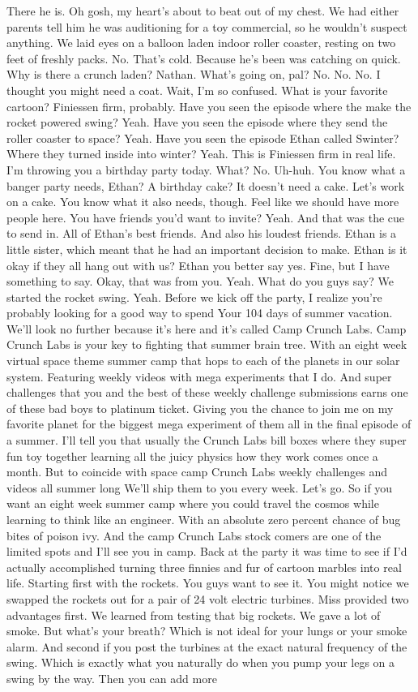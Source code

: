 \documentclass{article}
\begin{document}
There he is. Oh gosh, my heart's about to beat out of my chest. We had either parents tell him he was auditioning for a toy commercial, so he wouldn't suspect anything. We laid eyes on a balloon laden indoor roller coaster, resting on two feet of freshly packs. No. That's cold. Because he's been was catching on quick. Why is there a crunch laden? Nathan. What's going on, pal? No. No. No. I thought you might need a coat. Wait, I'm so confused. What is your favorite cartoon? Finiessen firm, probably. Have you seen the episode where the make the rocket powered swing? Yeah. Have you seen the episode where they send the roller coaster to space? Yeah. Have you seen the episode Ethan called Swinter? Where they turned inside into winter? Yeah. This is Finiessen firm in real life. I'm throwing you a birthday party today. What? No. Uh-huh. You know what a banger party needs, Ethan? A birthday cake? It doesn't need a cake. Let's work on a cake. You know what it also needs, though. Feel like we should have more people here. You have friends you'd want to invite? Yeah. And that was the cue to send in. All of Ethan's best friends. And also his loudest friends. Ethan is a little sister, which meant that he had an important decision to make. Ethan is it okay if they all hang out with us? Ethan you better say yes. Fine, but I have something to say. Okay, that was from you. Yeah. What do you guys say? We started the rocket swing. Yeah. Before we kick off the party, I realize you're probably looking for a good way to spend Your 104 days of summer vacation. We'll look no further because it's here and it's called Camp Crunch Labs. Camp Crunch Labs is your key to fighting that summer brain tree. With an eight week virtual space theme summer camp that hops to each of the planets in our solar system. Featuring weekly videos with mega experiments that I do. And super challenges that you and the best of these weekly challenge submissions earns one of these bad boys to platinum ticket. Giving you the chance to join me on my favorite planet for the biggest mega experiment of them all in the final episode of a summer. I'll tell you that usually the Crunch Labs bill boxes where they super fun toy together learning all the juicy physics how they work comes once a month. But to coincide with space camp Crunch Labs weekly challenges and videos all summer long We'll ship them to you every week. Let's go. So if you want an eight week summer camp where you could travel the cosmos while learning to think like an engineer. With an absolute zero percent chance of bug bites of poison ivy. And the camp Crunch Labs stock comers are one of the limited spots and I'll see you in camp. Back at the party it was time to see if I'd actually accomplished turning three finnies and fur of cartoon marbles into real life. Starting first with the rockets. You guys want to see it. You might notice we swapped the rockets out for a pair of 24 volt electric turbines. Miss provided two advantages first. We learned from testing that big rockets. We gave a lot of smoke. But what's your breath? Which is not ideal for your lungs or your smoke alarm. And second if you post the turbines at the exact natural frequency of the swing. Which is exactly what you naturally do when you pump your legs on a swing by the way. Then you can add more 
\end{document}
